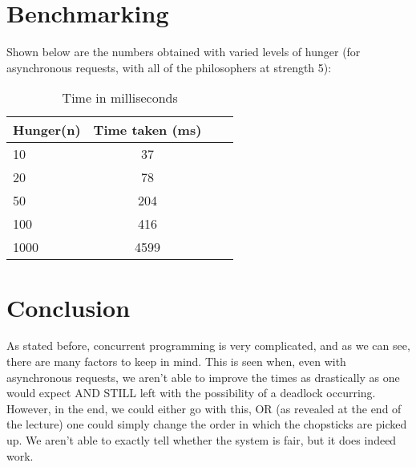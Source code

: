 \documentclass[a4paper,11pt]{article}
\begin{document}
\section*{Benchmarking}
Shown below are the numbers obtained with varied levels of hunger (for asynchronous requests, with all of the philosophers at strength 5):
\begin{table}[h]
\begin{center}
\begin{tabular}{l|c|c|c}
\textbf{Hunger(n)} & \textbf{Time taken (ms)}\\
\hline
  10     &  37\\
  20     &  78\\
  50     &  204\\
  100     &  416\\
  1000     &  4599\\
\end{tabular}
\caption{Time in milliseconds}
\label{tab:table}
\end{center}
\end{table}

\section*{Conclusion}
As stated before, concurrent programming is very complicated, and as we can see, there are many factors to keep in mind. This is seen when, even with asynchronous requests, we aren't able to improve the times as drastically as one would expect AND STILL left with the possibility of a deadlock occurring. However, in the end, we could either go with this, OR (as revealed at the end of the lecture) one could simply change the order in which the chopsticks are picked up. We aren't able to exactly tell whether the system is fair, but it does indeed work.
\end{document}
